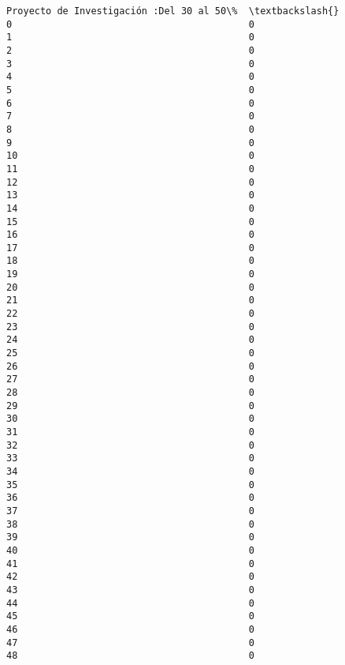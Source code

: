 \documentclass[11pt]{article}
\begin{document}
\begin{Verbatim}[commandchars=\\\{\}]
    Proyecto de Investigación :Del 30 al 50\%  \textbackslash{}
0                                          0   
1                                          0   
2                                          0   
3                                          0   
4                                          0   
5                                          0   
6                                          0   
7                                          0   
8                                          0   
9                                          0   
10                                         0   
11                                         0   
12                                         0   
13                                         0   
14                                         0   
15                                         0   
16                                         0   
17                                         0   
18                                         0   
19                                         0   
20                                         0   
21                                         0   
22                                         0   
23                                         0   
24                                         0   
25                                         0   
26                                         0   
27                                         0   
28                                         0   
29                                         0   
30                                         0   
31                                         0   
32                                         0   
33                                         0   
34                                         0   
35                                         0   
36                                         0   
37                                         0   
38                                         0   
39                                         0   
40                                         0   
41                                         0   
42                                         0   
43                                         0   
44                                         0   
45                                         0   
46                                         0   
47                                         0   
48                                         0   


\end{Verbatim}
\end{document}
